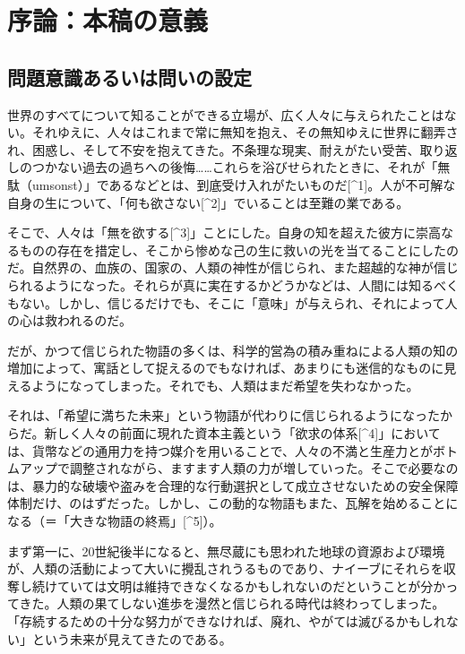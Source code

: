 \section{序論：本稿の意義}\label{ux5e8fux8ad6ux672cux7a3fux306eux610fux7fa9}

\subsection{問題意識あるいは問いの設定}\label{ux554fux984cux610fux8b58ux3042ux308bux3044ux306fux554fux3044ux306eux8a2dux5b9a}

世界のすべてについて知ることができる立場が、広く人々に与えられたことはない。それゆえに、人々はこれまで常に無知を抱え、その無知ゆえに世界に翻弄され、困惑し、そして不安を抱えてきた。不条理な現実、耐えがたい受苦、取り返しのつかない過去の過ちへの後悔\ldots\ldots これらを浴びせられたときに、それが「無駄（umsonst）」であるなどとは、到底受け入れがたいものだ{[}\^{}1{]}。人が不可解な自身の生について、「何も欲さない{[}\^{}2{]}」でいることは至難の業である。

そこで、人々は「無を欲する{[}\^{}3{]}」ことにした。自身の知を超えた彼方に崇高なるものの存在を措定し、そこから惨めな己の生に救いの光を当てることにしたのだ。自然界の、血族の、国家の、人類の神性が信じられ、また超越的な神が信じられるようになった。それらが真に実在するかどうかなどは、人間には知るべくもない。しかし、信じるだけでも、そこに「意味」が与えられ、それによって人の心は救われるのだ。

だが、かつて信じられた物語の多くは、科学的営為の積み重ねによる人類の知の増加によって、寓話として捉えるのでもなければ、あまりにも迷信的なものに見えるようになってしまった。それでも、人類はまだ希望を失わなかった。

それは、「希望に満ちた未来」という物語が代わりに信じられるようになったからだ。新しく人々の前面に現れた資本主義という「欲求の体系{[}\^{}4{]}」においては、貨幣などの通用力を持つ媒介を用いることで、人々の不満と生産力とがボトムアップで調整されながら、ますます人類の力が増していった。そこで必要なのは、暴力的な破壊や盗みを合理的な行動選択として成立させないための安全保障体制だけ、のはずだった。しかし、この動的な物語もまた、瓦解を始めることになる（＝「大きな物語の終焉」{[}\^{}5{]}）。

まず第一に、20世紀後半になると、無尽蔵にも思われた地球の資源および環境が、人類の活動によって大いに攪乱されうるものであり、ナイーブにそれらを収奪し続けていては文明は維持できなくなるかもしれないのだということが分かってきた。人類の果てしない進歩を漫然と信じられる時代は終わってしまった。「存続するための十分な努力ができなければ、廃れ、やがては滅びるかもしれない」という未来が見えてきたのである。

